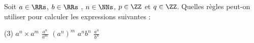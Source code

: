 %
%
Soit $a \in \RRs$, $b \in \RRs$ , $n\in \NNs$, $p \in \ZZ$ et $q \in \ZZ$.  Quelles règles peut-on utiliser pour calculer les expressions suivantes :
\begin{tasks}(3)
	\task	$a^n \times a^m$
	\task $\frac{a^n}{a^m}$
	\task $(a^n)^m$
	\task $a^n b^n$
	\task $\frac{a^n}{b^n}$
\end{tasks}

